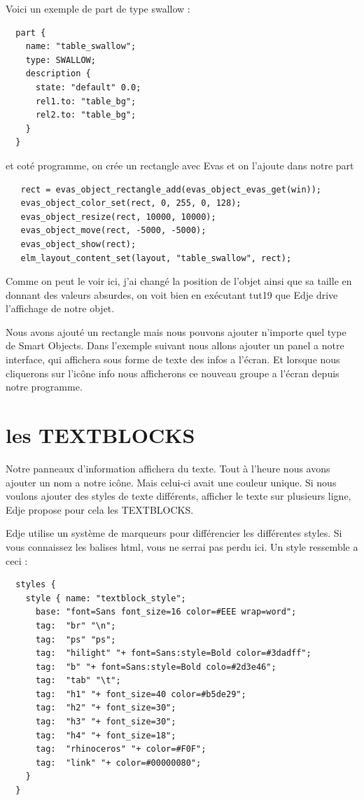 \documentclass[a4paper]{efr}
\begin{document}
Voici un exemple de part de type swallow :
\begin{lstlisting}
  part {
    name: "table_swallow";
    type: SWALLOW;
    description {
      state: "default" 0.0;
      rel1.to: "table_bg";
      rel2.to: "table_bg";
    }
  }
\end{lstlisting}

et coté programme, on crée un rectangle avec Evas et on l'ajoute dans notre part
\begin{lstlisting}
   rect = evas_object_rectangle_add(evas_object_evas_get(win));
   evas_object_color_set(rect, 0, 255, 0, 128);
   evas_object_resize(rect, 10000, 10000);
   evas_object_move(rect, -5000, -5000);
   evas_object_show(rect);
   elm_layout_content_set(layout, "table_swallow", rect);
\end{lstlisting}

Comme on peut le voir ici, j'ai changé la position de l'objet ainsi que sa
taille en donnant des valeurs absurdes, on voit bien en exécutant tut19 que
Edje drive l'affichage de notre objet.

Nous avons ajouté un rectangle mais nous pouvons ajouter n'importe quel type
de Smart Objects.
Dans l'exemple suivant nous allons ajouter un panel a notre interface, qui
affichera sous forme de texte des infos a l'écran. Et lorsque nous cliquerons
sur l'icône info nous afficherons ce nouveau groupe a l'écran depuis notre
programme.

\section{les TEXTBLOCKS}

Notre panneaux d'information affichera du texte. Tout à l'heure nous avons
ajouter un nom a notre icône. Mais celui-ci avait une couleur unique. Si nous
voulons ajouter des styles de texte différents, afficher le texte sur plusieurs
ligne, Edje propose pour cela les TEXTBLOCKS.

Edje utilise un système de marqueurs pour différencier les différentes styles.
Si vous connaissez les balises html, vous ne serrai pas perdu ici.
Un style ressemble a ceci :
\begin{lstlisting}
  styles {
    style { name: "textblock_style";
      base: "font=Sans font_size=16 color=#EEE wrap=word";
      tag:  "br" "\n";
      tag:  "ps" "ps";
      tag:  "hilight" "+ font=Sans:style=Bold color=#3dadff";
      tag:  "b" "+ font=Sans:style=Bold colo=#2d3e46";
      tag:  "tab" "\t";
      tag:  "h1" "+ font_size=40 color=#b5de29";
      tag:  "h2" "+ font_size=30";
      tag:  "h3" "+ font_size=30";
      tag:  "h4" "+ font_size=18";
      tag:  "rhinoceros" "+ color=#F0F";
      tag:  "link" "+ color=#00000080";
    }
  }
\end{lstlisting}
\end{document}
